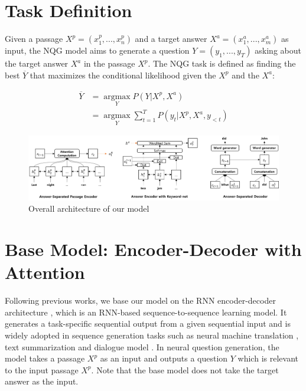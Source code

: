 \documentclass[letterpaper]{article} %
\begin{document}
\section{Task Definition}
Given a passage \(X^p = (x^p_1, ...,x^p_n)\) and a target answer \(X^a = (x^a_1, ..., x^a_m)\) as input, the NQG model aims to generate a question \(Y = (y_1, ...,y_T)\) asking about the target answer \(X^a\) in the passage \(X^p \). The NQG task is defined as finding the best \(\overline{Y}\) that maximizes the conditional likelihood given the \(X^p\) and the \(X^a\):

\begin{align}
\overline{Y} &= \underset{Y}{\operatorname{argmax}} P(Y|X^p, X^a) \label{eq_1} \\
& = \underset{Y}{\operatorname{argmax}} \sum_{t=1}^{T} P(y_t|X^p, X^a, y_{<t}) \label{eq_2}
\end{align}

\begin{figure}[!htb]
\centering
\includegraphics[width = \textwidth ]{overall_architecture.png}
\caption{Overall architecture of our model}
\label{fig:overall_architecture}
\end{figure}


\section{Base Model: Encoder-Decoder with Attention}
Following previous works, we base our model on the RNN encoder-decoder architecture \cite{sutskever2014sequence}, which is an RNN-based sequence-to-sequence learning model. It generates a task-specific sequential output from a given sequential input and is widely adopted in sequence generation tasks such as neural machine translation \cite{sutskever2014sequence,bahdanau2014neural}, text summarization \cite{nallapati2016abstractive} and dialogue model \cite{serban2016building,serban2017hierarchical}. In neural question generation, the model takes a passage \(X^p \) as an input and outputs a question \(Y\) which is relevant to the input passage \(X^p\). Note that the base model does not take the target answer as the input.
\end{document}
